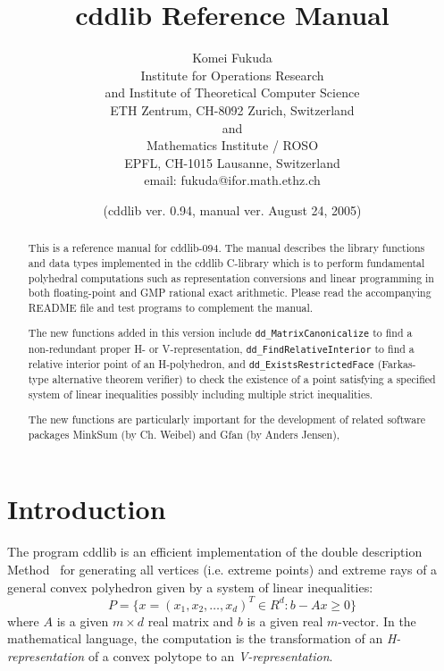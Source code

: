\documentclass[11pt]{article}
\newcommand {\0} {{\bf 0}}
\begin{document}
\title{cddlib Reference Manual}
\author{Komei Fukuda\\
Institute for Operations Research\\
and Institute of Theoretical Computer Science\\
ETH Zentrum, CH-8092 Zurich, Switzerland\\
and\\
Mathematics Institute / ROSO\\
EPFL, CH-1015 Lausanne, Switzerland\\
email: fukuda@ifor.math.ethz.ch\\
}
\date{ (cddlib ver. 0.94, manual ver. August 24, 2005)}

\maketitle

\tableofcontents

\begin{abstract}
This is a reference manual for cddlib-094.  
The manual describes the library functions and data types implemented 
in the cddlib C-library which is to perform fundamental polyhedral 
computations such as representation conversions and linear programming
in both floating-point and GMP rational exact arithmetic.
Please read the accompanying README file and test programs to 
complement the manual.

The new functions added in this version include {\tt dd\_MatrixCanonicalize}
to find a non-redundant proper H- or V-representation,
{\tt dd\_FindRelativeInterior} to find a relative interior point
of an H-polyhedron, and  {\tt dd\_ExistsRestrictedFace} (Farkas-type 
alternative theorem verifier)
to check the existence of a point satisfying a specified system
of linear inequalities possibly including multiple strict inequalities.

The new functions are particularly important for the development of
related software packages MinkSum (by Ch. Weibel) and Gfan
(by Anders Jensen),

\end{abstract}

\section{Introduction} \label{INTRODUCTION}

The program  cddlib  is an efficient implementation \cite{fp-ddmr-96}  of 
the double description Method~\cite{mrtt-ddm-53}
for generating  all vertices (i.e. extreme points)
and extreme rays of a general 
convex polyhedron given by 
a system of linear inequalities:
\[
   P = \{ x=(x_1, x_2, \ldots, x_d)^T \in R^{d}:  b - A  x  \ge 0 \}
\]
where $A$ is a given $m \times d$ real matrix and 
$b$ is a given real $m$-vector.   In the mathematical
language, the computation is the transformation
of an {\em H-representation\/} of a convex polytope
to an {\em V-representation}.  
\end{document}
